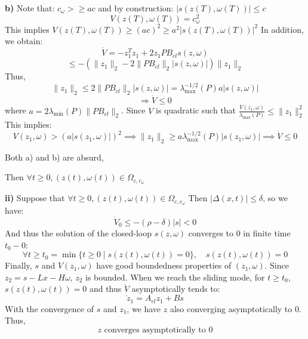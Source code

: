 \textbf{b)} Note that: \( c_\omega >\geq a c \) and by construction: \( |s(z(T), \omega(T))| \leq c \)
\begin{equation}
V(z(T), \omega(T)) = c_\omega^2
\end{equation}
This implies \( V(z(T), \omega(T)) \geq (a c)^2 \geq a^2 |s(z(T), \omega(T))|^2 \)
In addition, we obtain:
\begin{equation}
\dot{V} = -z_1^T z_1 + 2 z_1 P B_{cl} s(z, \omega)
\end{equation}
\begin{equation}
\leq -(\|z_1\|_2 - 2 \| P B_{cl}\|_2 |s(z, \omega)|) \|z_1\|_2
\end{equation}
Thus,
\begin{equation}
\|z_1\|_2 \leq 2 \| P B_{cl}\|_2 |s(z, \omega)| = \lambda_{\max}^{-1/2}(P) a |s(z, \omega)|
\end{equation}
\begin{equation}
\Rightarrow \dot{V} \leq 0
\end{equation}
where \( a = 2 \lambda_{\min}(P) \| P B_{cl}\|_2 \).
Since \( V \) is quadratic such that \( \frac{V(z_1, \omega)}{\lambda_{\max}(P)} \leq \|z_1\|_2^2\)
This implies:
\begin{equation}
V(z_1, \omega) > (a |s(z_1, \omega)|)^2 \implies \|z_1\|_2 \geq a \lambda_{\max}^{-1/2}(P) |s(z_1, \omega)| \implies \dot{V} \leq 0
\end{equation}


Both a) and b) are absurd,

Then \( \forall t \geq 0, (z(t), \omega(t)) \in \Omega_{c, c_\omega} \)

\textbf{ii)} Suppose that \( \forall t \geq 0, (z(t), \omega(t)) \in \Omega_{c, c_\omega} \)
Then \( |\Delta(x, t)| \leq \delta \), so we have:
\begin{equation}
\dot{V}_0 \leq -(\rho - \delta) |s| < 0
\end{equation}
And thus the solution of the closed-loop \( s(z, \omega) \) converges to 0 in finite time \( t_0 - 0 \):
\begin{equation}
\forall t \geq t_0 = \min \{ t \geq 0 \mid s(z(t), \omega(t)) = 0 \}, \quad s(z(t), \omega(t)) = 0
\end{equation}
Finally, \( s \) and \( V(z_1, \omega) \) have good boundedness properties of \( (z_1, \omega) \).
Since \( z_2 = s - Lx - H\omega \),
\( z_2 \) is bounded.
When we reach the sliding mode, for \( t \geq t_0 \), \( s(z(t), \omega(t)) = 0 \) and thus \( \dot{V} \) asymptotically tends to:
\begin{equation}
\dot{z}_1 = A_{cl} z_1 + B s 
\end{equation}
With the convergence of \( s \) and \( z_1 \), we have \( z \) also converging asymptotically to 0.
Thus,
\begin{equation}
z \text{ converges asymptotically to } 0
\end{equation}


